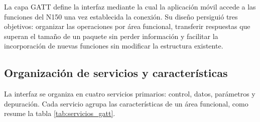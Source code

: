 La capa GATT define la interfaz mediante la cual la aplicación móvil accede a las funciones del N150 una vez establecida la conexión. Su diseño persiguió tres objetivos: organizar las operaciones por área funcional, transferir respuestas que superan el tamaño de un paquete sin perder información y facilitar la incorporación de nuevas funciones sin modificar la estructura existente.

\subsection{Organización de servicios y características}
\label{subsec:gatt_organizacion}

La interfaz se organiza en cuatro servicios primarios: control, datos, parámetros y depuración. Cada servicio agrupa las características de un área funcional, como resume la tabla \ref{tab:servicios_gatt}.

